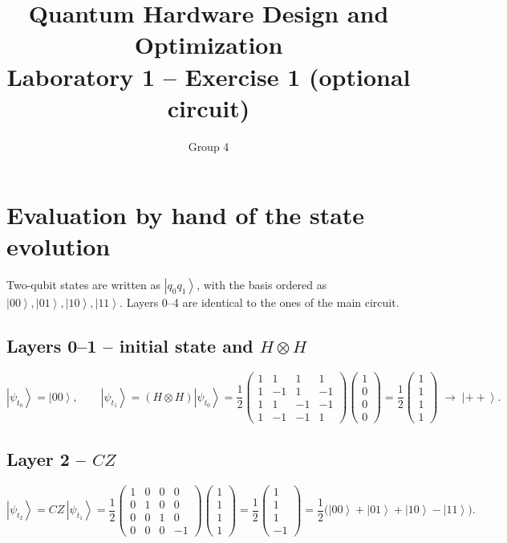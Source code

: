 \documentclass[11pt,a4paper]{article}
\title{Quantum Hardware Design and Optimization\\ Laboratory 1 -- Exercise 1 (optional circuit)}
\author{Group 4}
\date{}
\newcommand{\ket}[1]{\left|#1\right\rangle}
\newcommand{\psit}[1]{\ket{\psi_{t_{#1}}}}
\newcommand{\HH}{\begin{pmatrix} 1 & 1 & 1 & 1\\ 1 & -1 & 1 & -1\\ 1 & 1 & -1 & -1\\ 1 & -1 & -1 & 1 \end{pmatrix}}
\newcommand{\CZ}{\begin{pmatrix} 1 & 0 & 0 & 0\\ 0 & 1 & 0 & 0\\ 0 & 0 & 1 & 0\\ 0 & 0 & 0 & -1 \end{pmatrix}}
\begin{document}
\maketitle

\section*{Evaluation by hand of the state evolution}

Two-qubit states are written as $\ket{q_0 q_1}$, with the basis ordered as
$\ket{00},\ket{01},\ket{10},\ket{11}$.
Layers 0--4 are identical to the ones of the main circuit.

\subsection*{Layers 0--1 -- initial state and $H\otimes H$}
\[
\psit{0} = \ket{00}, \qquad
\psit{1} = (H\otimes H)\psit{0} = \frac12\HH\begin{pmatrix}1\\0\\0\\0\end{pmatrix}
= \frac12\begin{pmatrix}1\\1\\1\\1\end{pmatrix} \;\rightarrow\; \ket{++}.
\]

\subsection*{Layer 2 -- $CZ$}
\[
\psit{2} = CZ\,\psit{1} = \frac12\CZ\begin{pmatrix}1\\1\\1\\1\end{pmatrix}
= \frac12\begin{pmatrix}1\\1\\1\\-1\end{pmatrix}
= \frac12\big(\ket{00}+\ket{01}+\ket{10}-\ket{11}\big).
\]
\end{document}

